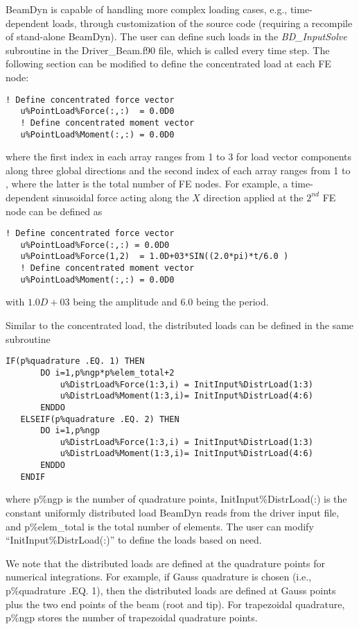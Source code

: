 BeamDyn is capable of handling more complex loading cases, e.g., time-dependent loads, through customization of the source code (requiring a recompile of stand-alone BeamDyn). 
The user can define such loads in the \textit{BD\_InputSolve} subroutine in the Driver\_Beam.f90 file, which is called every time step. 
The following section can be modified to define the concentrated load at each FE node:

\begin{lstlisting}[frame = single]
   ! Define concentrated force vector
   u%PointLoad%Force(:,:)  = 0.0D0
   ! Define concentrated moment vector
   u%PointLoad%Moment(:,:) = 0.0D0
\end{lstlisting}
where the first index in each array ranges from 1 to 3 for load vector components along three global directions and the second index of each array ranges from 1 to  , where the latter is the total number of FE nodes. 
For example, a time-dependent sinusoidal force acting along the $X$ direction applied at the $2^{nd}$ FE node can be defined as
\begin{lstlisting}[frame = single]
   ! Define concentrated force vector
   u%PointLoad%Force(:,:) = 0.0D0
   u%PointLoad%Force(1,2)  = 1.0D+03*SIN((2.0*pi)*t/6.0 )
   ! Define concentrated moment vector
   u%PointLoad%Moment(:,:) = 0.0D0
\end{lstlisting}
with $1.0D+03$ being the amplitude and $6.0$ being the period.

Similar to the concentrated load, the distributed loads can be defined in the same subroutine
\begin{lstlisting}[frame = single]
   IF(p%quadrature .EQ. 1) THEN
       DO i=1,p%ngp*p%elem_total+2
           u%DistrLoad%Force(1:3,i) = InitInput%DistrLoad(1:3)
           u%DistrLoad%Moment(1:3,i)= InitInput%DistrLoad(4:6)
       ENDDO
   ELSEIF(p%quadrature .EQ. 2) THEN
       DO i=1,p%ngp
           u%DistrLoad%Force(1:3,i) = InitInput%DistrLoad(1:3)
           u%DistrLoad%Moment(1:3,i)= InitInput%DistrLoad(4:6)
       ENDDO
   ENDIF
\end{lstlisting}
where p\%ngp is the number of quadrature points, InitInput\%DistrLoad(:) is the constant uniformly distributed load BeamDyn reads from the driver input file, and p\%elem\_total is the total number of elements. 
The user can modify ``InitInput\%DistrLoad(:)'' to define the loads based on need. 

We note that the distributed loads are defined at the quadrature points for numerical integrations. 
For example, if Gauss quadrature is chosen (i.e., p\%quadrature .EQ. 1), then the distributed loads are defined at Gauss points plus the two end points of the beam (root and tip).  For trapezoidal quadrature, p\%ngp stores the number of trapezoidal quadrature points.

